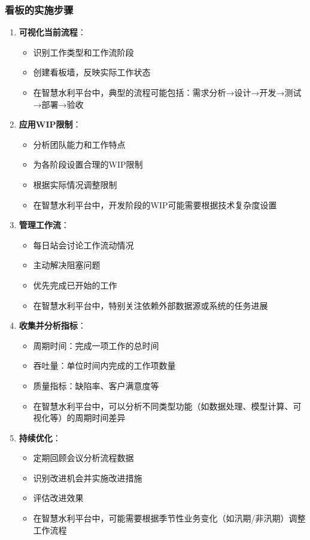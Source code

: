 \subsubsection{看板的实施步骤}\label{ux770bux677fux7684ux5b9eux65bdux6b65ux9aa4}

\begin{enumerate}
\def\labelenumi{\arabic{enumi}.}
\tightlist
\item
  \textbf{可视化当前流程}：

  \begin{itemize}
  \tightlist
  \item
    识别工作类型和工作流阶段
  \item
    创建看板墙，反映实际工作状态
  \item
    在智慧水利平台中，典型的流程可能包括：需求分析→设计→开发→测试→部署→验收
  \end{itemize}
\item
  \textbf{应用WIP限制}：

  \begin{itemize}
  \tightlist
  \item
    分析团队能力和工作特点
  \item
    为各阶段设置合理的WIP限制
  \item
    根据实际情况调整限制
  \item
    在智慧水利平台中，开发阶段的WIP可能需要根据技术复杂度设置
  \end{itemize}
\item
  \textbf{管理工作流}：

  \begin{itemize}
  \tightlist
  \item
    每日站会讨论工作流动情况
  \item
    主动解决阻塞问题
  \item
    优先完成已开始的工作
  \item
    在智慧水利平台中，特别关注依赖外部数据源或系统的任务进展
  \end{itemize}
\item
  \textbf{收集并分析指标}：

  \begin{itemize}
  \tightlist
  \item
    周期时间：完成一项工作的总时间
  \item
    吞吐量：单位时间内完成的工作项数量
  \item
    质量指标：缺陷率、客户满意度等
  \item
    在智慧水利平台中，可以分析不同类型功能（如数据处理、模型计算、可视化等）的周期时间差异
  \end{itemize}
\item
  \textbf{持续优化}：

  \begin{itemize}
  \tightlist
  \item
    定期回顾会议分析流程数据
  \item
    识别改进机会并实施改进措施
  \item
    评估改进效果
  \item
    在智慧水利平台中，可能需要根据季节性业务变化（如汛期/非汛期）调整工作流程
  \end{itemize}
\end{enumerate}

